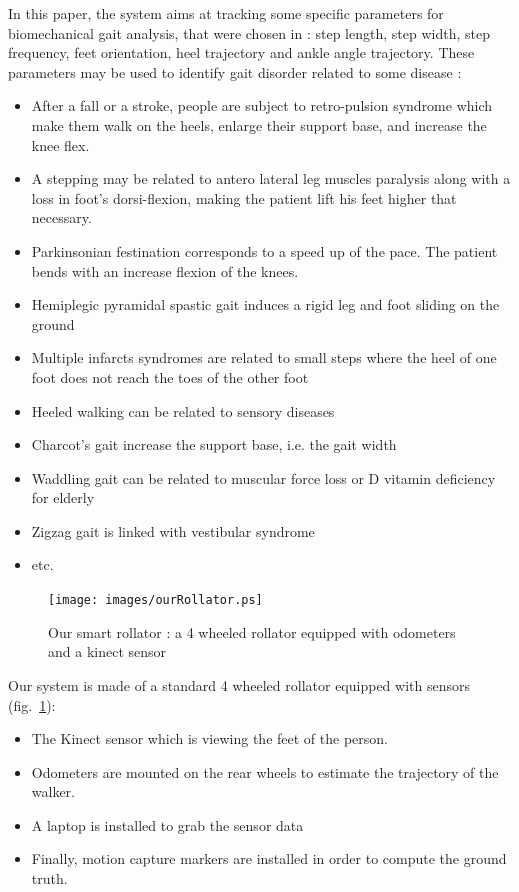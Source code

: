 \documentclass[letterpaper, 10 pt, conference]{ieeeconf}
\newcommand{\CDOK}[2]{{#1}} %
\newcommand{\CJOK}[2]{{#1}} %
\begin{document}
In this paper, the system aims at tracking some specific parameters for biomechanical gait analysis, that were chosen in \cite{Dune12} : step length, step width, step frequency, feet orientation, heel trajectory and ankle angle trajectory.
These parameters may be used to identify gait disorder related to some disease :
\begin{itemize} 
\item After a fall or a stroke, people are subject to retro-pulsion syndrome which make them walk on the heels, enlarge their support base, and increase the knee flex. 
\item A stepping may be related to antero lateral leg muscles paralysis along with a loss in foot's dorsi-flexion, making the patient lift his feet higher that necessary. 
\item Parkinsonian festination corresponds to a speed up of the pace. The patient bends with an increase flexion of the knees.
\item Hemiplegic pyramidal spastic gait induces a rigid leg and foot sliding on the ground
\item Multiple infarcts syndromes are related to small steps where the heel of one foot does not reach the toes of the other foot
\item Heeled walking can be related to sensory diseases
\item Charcot's gait increase the support base, i.e. the gait width
\item Waddling gait can be related to muscular force loss or D 	
vitamin deficiency for elderly
\item Zigzag gait is linked with vestibular syndrome
\item etc.
\end{itemize}



\begin{figure}[h]
	\centering
	\texttt{[image: images/ourRollator.ps]}
	\caption{Our smart rollator : a 4 wheeled rollator equipped with odometers and a kinect sensor}
	\label{fig:ourrollator}
\end{figure}


Our system is made \CDOK{of}{by} a standard \CDOK{4 wheeled rollator}{walker} \CDOK{equipped with sensors}{on which some equipment was installed} (fig.~\ref{fig:ourrollator}):
\begin{itemize}
	\item The Kinect sensor which is viewing the feet of the person.
	\item Odometers \CDOK{are}{were} mounted on the rear wheels to estimate the trajectory of the walker.
	\item A laptop \CDOK{is}{was} installed to grab the sensor data
	\item Finally, motion capture\CJOK{}{\footnote{A Qualisys system is used.}} markers \CDOK{are}{were} installed in order to compute the ground truth. 
\end{itemize}
\end{document}
